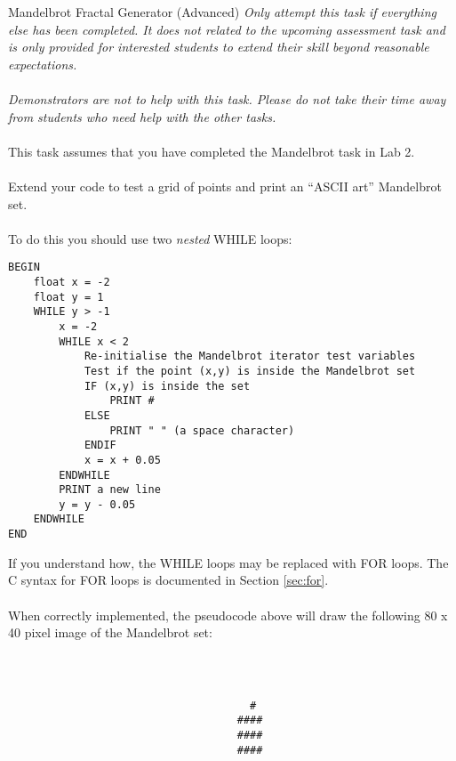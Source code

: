 \documentclass{lab}
\begin{document}
\begin{task}{Mandelbrot Fractal Generator (Advanced)}{}
\textit{Only attempt this task if everything else has been completed. It does not related to the upcoming assessment task and is only provided for interested students to extend their skill beyond reasonable expectations.\\ \\Demonstrators are not to help with this task. Please do not take their time away from students who need help with the other tasks.}
\\ \\
This task assumes that you have completed the Mandelbrot task in Lab 2.
\\ \\
Extend your code to test a grid of points and print an ``ASCII art'' Mandelbrot set.
\\ \\
To do this you should use two \textit{nested} WHILE loops:

\begin{lstlisting}[style=pseudo]
BEGIN
	float x = -2
	float y = 1
	WHILE y > -1
		x = -2
		WHILE x < 2
			Re-initialise the Mandelbrot iterator test variables
			Test if the point (x,y)	is inside the Mandelbrot set
			IF (x,y) is inside the set
				PRINT #
			ELSE
				PRINT " " (a space character)
			ENDIF
			x = x + 0.05
		ENDWHILE
		PRINT a new line
		y = y - 0.05
	ENDWHILE
END
\end{lstlisting}

If you understand how, the WHILE loops may be replaced with FOR loops. The C syntax for FOR loops is documented in Section \ref{sec:for}.
\\ \\
When correctly implemented, the pseudocode above will draw the following 80 x 40 pixel image of the Mandelbrot set:

\begin{lstlisting}[style=pseudo,basicstyle=\ttfamily\tiny]
                                                                                 
                                                                                 
                                                                                 
                                      #                                          
                                    ####                                         
                                    ####                                         
                                    ####                                         
                                                                                 

\end{lstlisting}
\end{task}
\end{document}
